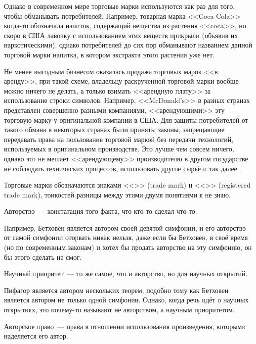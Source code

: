 Однако в современном мире торговые марки используются как раз для того, чтобы обманывать потребителей. 
Например, товарная марка <<Coca-Cola>> когда-то обозначала напиток, содержащий вещества из растения <<coca>>, но скоро в США лавочку с использованием этих веществ прикрыли (объявив их наркотическими), однако потребителей до сих пор обманывают названием данной торговой марки напитка, в котором экстракта этого растения уже нет.

Не менее выгодным бизнесом оказалась продажа торговых марок <<в аренду>>, при такой схеме, владельцу раскрученной торговой марки вообще можно ничего не делать, а только взимать <<арендную плату>> за использование строки символов.
Например, <<McDonald's>> в разных странах представлен совершенно разными компаниями, <<арендующими>> эту торговую марку у оригинальной компании в США.
Для защиты потребителей от такого обмана в некоторых странах были приняты законы, запрещающие передавать права на пользование торговой маркой без передачи технологий, используемых в оригинальном производстве.
Это лучше чем совсем ничего, однако это не мешает <<арендующему>> производителю в другом государстве не соблюдать технических процессов, использовать другое сырьё и так далее.

Торговые марки обозначаются знаками <<\texttrademark>> (trade mark) и <<\textregistered>> (registered trade mark), тонкостей разницы между этими двумя понятиями я не знаю.

\begin{definition}
Авторство~--- констатация того факта, что кто-то сделал что-то.
\end{definition}

Например, Бетховен является автором своей девятой симфонии, и его авторство от самой симфонии оторвать никак нельзя, даже если бы Бетховен, в своё время (но по современным законам) и хотел бы продать авторство на эту симфонию, он бы этого сделать не смог.

\begin{definition}
Научный приоритет~--- то же самое, что и авторство, но для научных открытий.
\end{definition}

Пифагор является автором нескольких теорем, подобно тому как Бетховен является автором не только одной симфонии.
Однако, когда речь идёт о научных открытиях, это почему-то называют не авторством, а научным приоритетом.

\begin{definition}
Авторское право~--- права в отношении использования произведения, которыми наделяется его автор.
\end{definition}


